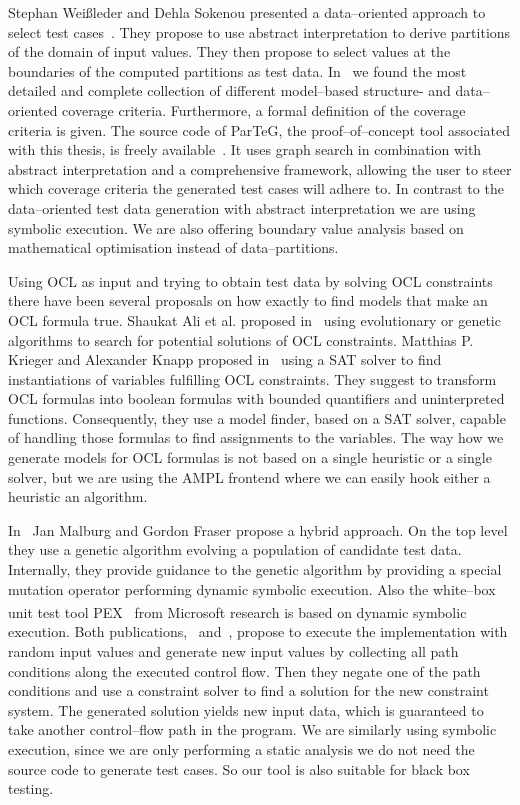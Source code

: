 \documentclass[runningheads,a4paper]{llncs}%
\begin{document}
Stephan Wei{\ss}leder and Dehla Sokenou presented a data--oriented approach to
select test cases~\cite{weissleder2008automatic}. They propose to use abstract
interpretation to derive partitions of the domain of input values. They then
propose to select values at the boundaries of the computed partitions as test
data. In~\cite{ParTeG} we found the most detailed and complete collection of
different model--based structure- and data--oriented coverage criteria.
Furthermore, a formal definition of the coverage criteria is given. The source
code of ParTeG, the proof--of--concept tool associated with this thesis, is
freely available~\cite{PartegWebsite}. It uses graph search in combination with
abstract interpretation and a comprehensive framework, allowing the user to
steer which coverage criteria the generated test cases will adhere to. In
contrast to the data--oriented test data generation with abstract interpretation
we are using symbolic execution. We are also offering boundary value analysis
based on mathematical optimisation instead of data--partitions.

Using OCL as input and trying to obtain test data by solving OCL constraints
there have been several proposals on how exactly to find models that make an OCL
formula true. Shaukat Ali et al. proposed in~\cite{ali2011search} using
evolutionary or genetic algorithms to search for potential solutions of OCL
constraints. Matthias P. Krieger and Alexander Knapp proposed
in~\cite{krieger2008executingUnderspecifiedOCL} using a SAT solver to find
instantiations of variables fulfilling OCL constraints. They suggest to
transform OCL formulas into boolean formulas with bounded quantifiers and
uninterpreted functions. Consequently, they use a model finder, based on a SAT
solver, capable of handling those formulas to find assignments to the variables.
The way how we generate models for OCL formulas is not based on a single
heuristic or a single solver, but we are using the AMPL frontend where we can
easily hook either a heuristic an algorithm.

In~\cite{malburg2011combining} Jan Malburg and Gordon Fraser propose a hybrid
approach. On the top level they use a genetic algorithm evolving a population of
candidate test data. Internally, they provide guidance to the genetic algorithm
by providing a special mutation operator performing dynamic symbolic execution.
Also the white--box unit test tool PEX~\cite{pex} from
Microsoft\textsuperscript{\textregistered} research is based on dynamic symbolic
execution. Both publications,~\cite{malburg2011combining} and~\cite{pex},
propose to execute the implementation with random input values and generate new
input values by collecting all path conditions along the executed control flow.
Then they negate one of the path conditions and use a constraint solver to find
a solution for the new constraint system. The generated solution yields new
input data, which is guaranteed to take another control--flow path in the
program. We are similarly using symbolic execution, since we are only performing
a static analysis we do not need the source code to generate test cases. So our
tool is also suitable for black box testing.
\end{document}
